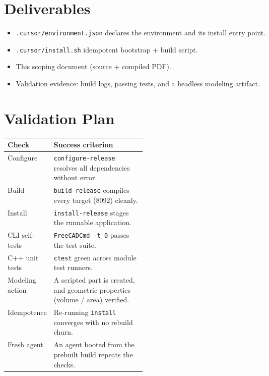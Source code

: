 \documentclass[11pt]{article}
\begin{document}
\section{Deliverables}
\begin{itemize}
  \item \texttt{.cursor/environment.json} \textemdash{} declares the environment and its install entry point.
  \item \texttt{.cursor/install.sh} \textemdash{} idempotent bootstrap + build script.
  \item This scoping document (source + compiled PDF).
  \item Validation evidence: build logs, passing tests, and a headless modeling artifact.
\end{itemize}

\section{Validation Plan}
\noindent\begin{tabularx}{\linewidth}{@{}p{0.32\linewidth}L@{}}
\toprule
\textbf{Check} & \textbf{Success criterion} \\
\midrule
Configure & \texttt{configure-release} resolves all dependencies without error. \\
Build & \texttt{build-release} compiles every target (8092) cleanly. \\
Install & \texttt{install-release} stages the runnable application. \\
CLI self-tests & \texttt{FreeCADCmd -t 0} passes the test suite. \\
C++ unit tests & \texttt{ctest} green across module test runners. \\
Modeling action & A scripted part is created, and geometric properties (volume / area) verified. \\
Idempotence & Re-running \texttt{install} converges with no rebuild churn. \\
Fresh agent & An agent booted from the prebuilt build repeats the checks. \\
\bottomrule
\end{tabularx}

\end{document}
